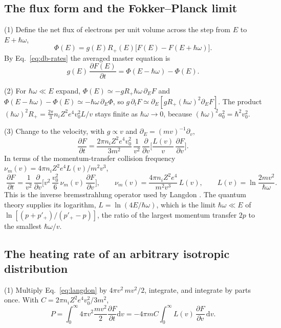 \documentclass[11pt]{article}
\numberwithin{equation}{section}
\newcommand{\dd}{\mathrm d}
\begin{document}
\subsection{The flux form and the Fokker--Planck limit}
{\noindent}(1) Define the net flux of electrons per unit volume across the
step from $E$ to $E+\hbar\omega$,
\begin{equation}
\Phi(E)=g(E)R_+(E)\big[F(E)-F(E+\hbar\omega)\big].
\end{equation}
By Eq.~\eqref{eq:db-rates} the averaged master equation is
\begin{equation}
g(E)\,\frac{\partial F(E)}{\partial t}=\Phi(E-\hbar\omega)-\Phi(E).
\end{equation}

{\noindent}(2) For $\hbar\omega\ll E$ expand,
$\Phi(E)\simeq-g R_+\hbar\omega\,\partial_EF$ and
$\Phi(E-\hbar\omega)-\Phi(E)\simeq-\hbar\omega\,\partial_E\Phi$, so
$g\,\partial_tF\simeq\partial_E[gR_+(\hbar\omega)^2\partial_EF]$. The product
$(\hbar\omega)^2R_+=\tfrac{2\pi}{3}n_iZ^2e^4v_0^2L/v$ stays finite as
$\hbar\omega\to0$, because $(\hbar\omega)^2a_0^2=\hbar^2v_0^2$.

{\noindent}(3) Change to the velocity, with $g\propto v$ and
$\partial_E=(mv)^{-1}\partial_v$,
\begin{equation}
\frac{\partial F}{\partial t}=\frac{2\pi n_iZ^2e^4v_0^2}{3m^2}\,\frac{1}{v^2}\,
\frac{\partial}{\partial v}\Big[\frac{L(v)}{v}\,\frac{\partial F}{\partial v}\Big].
\end{equation}
In terms of the momentum-transfer collision frequency
$\nu_m(v)=4\pi n_iZ^2e^4L(v)/m^2v^3$,
\begin{equation}
\boxed{\;\frac{\partial F}{\partial t}=\frac{1}{v^2}\,\frac{\partial}{\partial v}
\Big[v^2\,\frac{v_0^2}{6}\,\nu_m(v)\,\frac{\partial F}{\partial v}\Big],\qquad
\nu_m(v)=\frac{4\pi n_iZ^2e^4}{m^2v^3}\,L(v),\qquad L(v)=\ln\frac{2mv^2}{\hbar\omega}.\;}
\label{eq:langdon}
\end{equation}
This is the inverse bremsstrahlung operator used by Langdon \cite{Langdon1980}.
The quantum theory supplies its logarithm, $L=\ln(4E/\hbar\omega)$, which is the
limit $\hbar\omega\ll E$ of $\ln[(p+p'_+)/(p'_+-p)]$, the ratio of the largest
momentum transfer $2p$ to the smallest $\hbar\omega/v$.

\subsection{The heating rate of an arbitrary isotropic distribution}
{\noindent}(1) Multiply Eq.~\eqref{eq:langdon} by $4\pi v^2\,mv^2/2$, integrate,
and integrate by parts once. With $C=2\pi n_iZ^2e^4v_0^2/3m^2$,
\begin{equation}
P=\int_0^\infty4\pi v^2\frac{mv^2}{2}\frac{\partial F}{\partial t}\dd v
=-4\pi mC\int_0^\infty L(v)\,\frac{\partial F}{\partial v}\,\dd v.
\end{equation}
\end{document}
